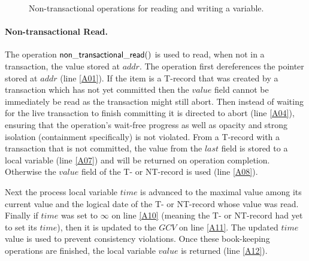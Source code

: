 \begin{figure}[htb]
{{\begin{minipage}[t]{1\linewidth}
\begin{tabbing}
\end{tabbing}
\normalsize
\end{minipage}
}
\caption{Non-transactional operations for reading and writing a variable.}
\label{fig:ntops}
}
\end{figure}

\paragraph{Non-transactional Read.}
The   operation  ${\sf   non\_transactional\_read()}$  is   used   to  read,
when not in a transaction, the value stored at
$\mathit{addr}$.
The  operation first  dereferences  the pointer  stored at  $\mathit{addr}$
(line \ref{A01}).
If the item is a T-record that was created by a 
transaction which  has not yet  committed then the $\mathit{value}$ field
cannot be immediately be read as the transaction might still abort.
Then instead of waiting for the live transaction to finish committing it is directed to abort (line \ref{A04}),
ensuring that the operation's wait-free progress as well as opacity and strong isolation (containment specifically) is not violated.
From a T-record with a transaction that is not committed, the value from the $\mathit{last}$
field is stored to a local variable (line \ref{A07}) and will be returned on operation completion.
Otherwise the $\mathit{value}$ field of the T- or NT-record is used (line \ref{A08}).


Next the process local variable $\mathit{time}$ is advanced to 
the maximal 
value among its current 
value and the logical date of the T- or NT-record whose value was read.
Finally if $\mathit{time}$ was set to $\infty$ on line \ref{A10}
(meaning the T- or NT-record had yet to set its $\mathit{time}$), then it is updated
to the $\mathit{GCV}$ on line \ref{A11}.
The updated  $\mathit{time}$
value is used 
to prevent consistency 
violations. %
Once these book-keeping 
operations are finished, the local variable $\mathit{value}$
is returned (line \ref{A12}).


